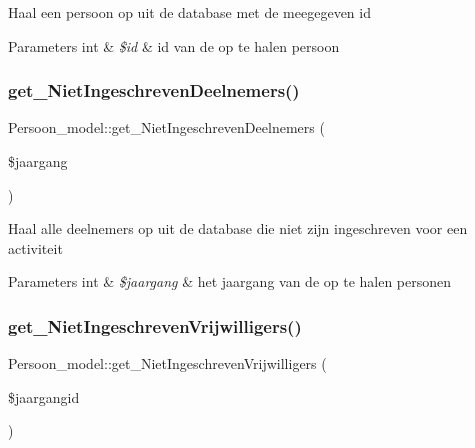 Haal een persoon op uit de database met de meegegeven id 
\begin{DoxyParams}[1]{Parameters}
int & {\em \$id} & id van de op te halen persoon \\
\hline
\end{DoxyParams}
\mbox{\label{class_persoon__model_a57ca8d2df6874e19154b614986f1a7a5}} 
\subsubsection{\texorpdfstring{get\+\_\+\+Niet\+Ingeschreven\+Deelnemers()}{get\_NietIngeschrevenDeelnemers()}}
{\footnotesize\ttfamily Persoon\+\_\+model\+::get\+\_\+\+Niet\+Ingeschreven\+Deelnemers (\begin{DoxyParamCaption}\item[{}]{\$jaargang }\end{DoxyParamCaption})}

Haal alle deelnemers op uit de database die niet zijn ingeschreven voor een activiteit 
\begin{DoxyParams}[1]{Parameters}
int & {\em \$jaargang} & het jaargang van de op te halen personen \\
\hline
\end{DoxyParams}
\mbox{\label{class_persoon__model_adc89349e61542f626e55f722d5c09c98}} 
\subsubsection{\texorpdfstring{get\+\_\+\+Niet\+Ingeschreven\+Vrijwilligers()}{get\_NietIngeschrevenVrijwilligers()}}
{\footnotesize\ttfamily Persoon\+\_\+model\+::get\+\_\+\+Niet\+Ingeschreven\+Vrijwilligers (\begin{DoxyParamCaption}\item[{}]{\$jaargangid }\end{DoxyParamCaption})}


